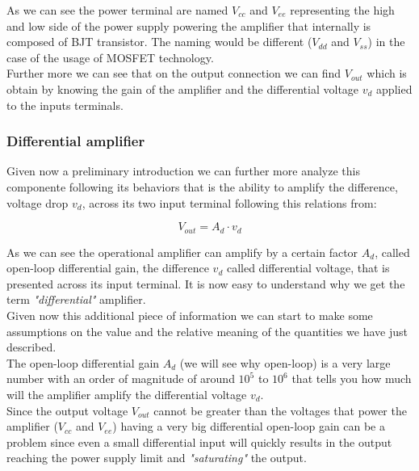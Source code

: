 \documentclass[../main.tex]{subfiles}
\begin{document}
As we can see the power terminal are named $V_{cc}$ and $V_{ee}$ representing the high and low side of the power supply powering the amplifier that internally is composed of BJT transistor. The naming would be different ($V_{dd}$ and $V_{ss}$) in the case of the usage of MOSFET technology.\\

Further more we can see that on the output connection we can find $V_{out}$ which is obtain by knowing the gain of the amplifier and the differential voltage $v_d$ applied to the inputs terminals. 


\subsubsection{Differential amplifier}

Given now a preliminary introduction we can further more analyze this componente following its behaviors that is the ability to amplify the difference, voltage drop $v_d$, across its two input terminal following this relations from:

\begin{equation}
	V_{out} = A_d \cdot v_d
\end{equation}

As we can see the operational amplifier can amplify by a certain factor $A_d$, called open-loop differential gain, the difference $v_d$ called differential voltage, that is presented across its input terminal. It is now easy to understand why we get the term \textit{"differential"} amplifier.\\

Given now this additional piece of information we can start to make some assumptions on the value and the relative meaning of the quantities we have just described.\\

The open-loop differential gain $A_d$ (we will see why open-loop) is a very large number with an order of magnitude of around $10^5$ to $10^6$ that tells you how much will the amplifier amplify the differential voltage $v_d$.\\

Since the output voltage $V_{out}$ cannot be greater than the voltages that power the amplifier ($V_{cc}$ and $V_{ee}$) having a very big differential open-loop gain can be a problem since even a small differential input will quickly results in the output reaching the power supply limit and \textit{"saturating"} the output.\\
\end{document}
